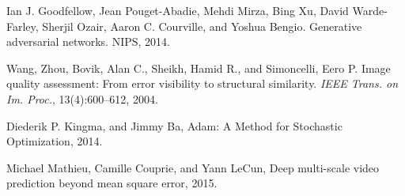 \documentclass{article}
\begin{document}
\clearpage

\begin{thebibliography}{9}
Ian J. Goodfellow, Jean Pouget-Abadie, Mehdi Mirza, Bing Xu, David Warde-Farley, Sherjil Ozair, Aaron C. Courville, and Yoshua Bengio. Generative adversarial networks. NIPS, 2014.

Wang, Zhou, Bovik, Alan C., Sheikh, Hamid R., and Simoncelli, Eero P. Image quality assessment: From error visibility to structural similarity. \textit{IEEE Trans. on Im. Proc.}, 13(4):600–612, 2004.

Diederik P. Kingma, and Jimmy Ba, Adam: A Method for Stochastic Optimization, 2014.

Michael Mathieu, Camille Couprie, and Yann LeCun, Deep multi-scale video prediction beyond mean square error, 2015.

\end{thebibliography}
\end{document}
